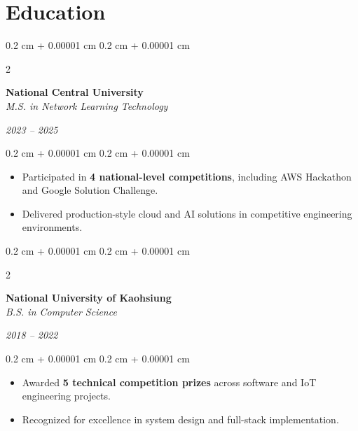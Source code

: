 \documentclass[10pt, letterpaper]{article}
\newenvironment{highlights}{
    \begin{itemize}[
        topsep=0.10 cm,
        parsep=0.10 cm,
        partopsep=0pt,
        itemsep=0pt,
        leftmargin=0.4 cm + 10pt
    ]
}{
    \end{itemize}
} %
\newenvironment{onecolentry}{
    \begin{adjustwidth}{
        0.2 cm + 0.00001 cm
    }{
        0.2 cm + 0.00001 cm
    }
}{
    \end{adjustwidth}
} %
\newenvironment{twocolentry}[2][]{
    \onecolentry
    \def\secondColumn{#2}
    \setcolumnwidth{\fill, 4.5 cm}
    \begin{paracol}{2}
}{
    \switchcolumn \raggedleft \secondColumn
    \end{paracol}
    \endonecolentry
} %
\begin{document}
    \section{Education}

\begin{twocolentry}{\textit{2023 – 2025}}
\textbf{National Central University} \\
\textit{M.S. in Network Learning Technology}
\end{twocolentry}

\begin{onecolentry}
\begin{highlights}
    \item Participated in \textbf{4 national-level competitions}, including AWS Hackathon and Google Solution Challenge.
    \item Delivered production-style cloud and AI solutions in competitive engineering environments.
\end{highlights}
\end{onecolentry}

\vspace{0.2 cm}

\begin{twocolentry}{\textit{2018 – 2022}}
\textbf{National University of Kaohsiung} \\
\textit{B.S. in Computer Science}
\end{twocolentry}

\begin{onecolentry}
\begin{highlights}
    \item Awarded \textbf{5 technical competition prizes} across software and IoT engineering projects.
    \item Recognized for excellence in system design and full-stack implementation.
\end{highlights}
\end{onecolentry}
\end{document}
